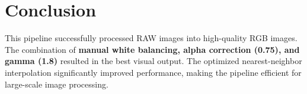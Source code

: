 \documentclass[a4paper,10pt]{article}
\begin{document}

\section{Conclusion}
This pipeline successfully processed RAW images into high-quality RGB images. 
The combination of \textbf{manual white balancing, alpha correction (0.75), and gamma (1.8)} 
resulted in the best visual output. The optimized nearest-neighbor interpolation significantly 
improved performance, making the pipeline efficient for large-scale image processing.

\end{document}
